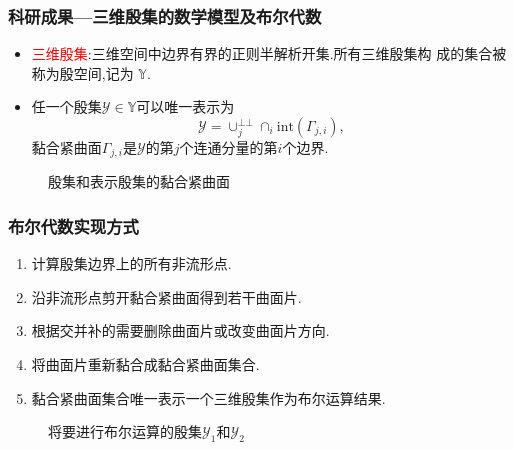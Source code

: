 \documentclass[UTF8]{ctexbeamer}	%
\theoremstyle{plain}
\theoremstyle{definition}
\theoremstyle{remark}
\numberwithin{equation}{section}
\begin{document}
\begin{frame}
    \frametitle{科研成果---三维殷集的数学模型及布尔代数}
    \begin{itemize}
        \item \textcolor{red}{三维殷集}:三维空间中边界有界的正则半解析开集.所有三维殷集构
              成的集合被称为殷空间,记为 $\mathbb{Y}$.
        \item 任一个殷集$\mathcal{Y} \in \mathbb{Y}$可以唯一表示为
              \[\mathcal{Y} = \cup_j^{\bot \bot} \cap_i \text{int}(\Gamma_{j, i}),\]
              黏合紧曲面$\Gamma_{j, i}$是$\mathcal{Y}$的第$j$个连通分量的第$i$个边界.
    \end{itemize}
    \begin{figure}[!htb]
        \centering
         \qquad
        \caption{殷集和表示殷集的黏合紧曲面}
        \vspace{0.2in}
    \end{figure}
\end{frame}

\begin{frame}
    \frametitle{布尔代数实现方式}
    \begin{enumerate}
        \item 计算殷集边界上的所有非流形点.
        \item 沿非流形点剪开黏合紧曲面得到若干曲面片.
        \item 根据交并补的需要删除曲面片或改变曲面片方向.
        \item 将曲面片重新黏合成黏合紧曲面集合.
        \item 黏合紧曲面集合唯一表示一个三维殷集作为布尔运算结果.
    \end{enumerate}
    \begin{figure}[!htb]
        \centering
         \qquad
        \caption{将要进行布尔运算的殷集$\mathcal{Y}_1$和$\mathcal{Y}_2$}
        \vspace{0.2in}
    \end{figure}
\end{frame}
\end{document}
